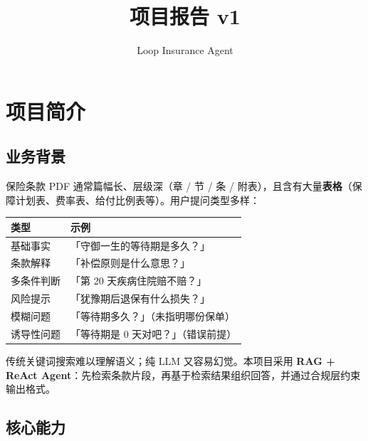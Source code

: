 \documentclass[11pt,a4paper]{ctexart}
\title{项目报告 v1}
\author{Loop Insurance Agent}
\date{}
\begin{document}
\maketitle
\tableofcontents
\newpage

\section{项目简介}

\subsection{业务背景}

保险条款 PDF 通常篇幅长、层级深（章 / 节 / 条 / 附表），且含有大量\textbf{表格}（保障计划表、费率表、给付比例表等）。用户提问类型多样：

\begin{center}
\begin{tabular}{ll}
\toprule
\textbf{类型} & \textbf{示例} \\
\midrule
基础事实 & 「守御一生的等待期是多久？」 \\
条款解释 & 「补偿原则是什么意思？」 \\
多条件判断 & 「第 20 天疾病住院赔不赔？」 \\
风险提示 & 「犹豫期后退保有什么损失？」 \\
模糊问题 & 「等待期多久？」（未指明哪份保单） \\
诱导性问题 & 「等待期是 0 天对吧？」（错误前提） \\
\bottomrule
\end{tabular}
\end{center}

传统关键词搜索难以理解语义；纯 LLM 又容易幻觉。本项目采用 \textbf{RAG + ReAct Agent}：先检索条款片段，再基于检索结果组织回答，并通过合规层约束输出格式。

\subsection{核心能力}
\end{document}
